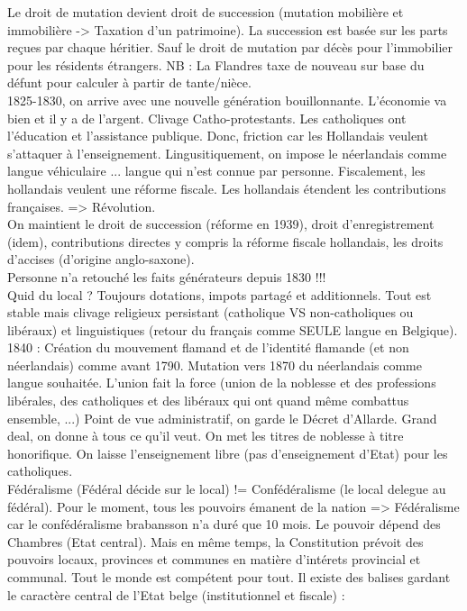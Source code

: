 \documentclass{book}
\begin{document}
Le droit de mutation devient droit de succession (mutation mobilière et immobilière -> Taxation d'un patrimoine). La succession est basée sur les parts reçues par chaque héritier. Sauf le droit de mutation par décès pour l'immobilier pour les résidents étrangers. NB : La Flandres taxe de nouveau sur base du défunt pour calculer à partir de tante/nièce.\\

1825-1830, on arrive avec une nouvelle génération bouillonnante. L'économie va bien et il y a de l'argent. Clivage Catho-protestants. Les catholiques ont l'éducation et l'assistance publique. Donc, friction car les Hollandais veulent s'attaquer à l'enseignement. Lingusitiquement, on impose le néerlandais comme langue véhiculaire ... langue qui n'est connue par personne. Fiscalement, les hollandais veulent une réforme fiscale. Les hollandais étendent les contributions françaises. => Révolution.\\

On maintient le droit de succession (réforme en 1939), droit d'enregistrement (idem), contributions directes y compris la réforme fiscale hollandais, les droits d'accises (d'origine anglo-saxone).\\

Personne n'a retouché les faits générateurs depuis 1830 !!!\\

Quid du local ? Toujours dotations, impots partagé et additionnels. Tout est stable mais clivage religieux persistant (catholique VS non-catholiques ou libéraux) et linguistiques (retour du français comme SEULE langue en Belgique). 1840 : Création du mouvement flamand et de l'identité flamande (et non néerlandais) comme avant 1790. Mutation vers 1870 du néerlandais comme langue souhaitée. L'union fait la force (union de la noblesse et des professions libérales, des catholiques et des libéraux qui ont quand même combattus ensemble, ...) Point de vue administratif, on garde le Décret d'Allarde. Grand deal, on donne à tous ce qu'il veut. On met les titres de noblesse à titre honorifique. On laisse l'enseignement libre (pas d'enseignement d'Etat) pour les catholiques.\\

Fédéralisme (Fédéral décide sur le local) != Confédéralisme (le local delegue au fédéral). Pour le moment, tous les pouvoirs émanent de la nation => Fédéralisme car le confédéralisme brabansson n'a duré que 10 mois. Le pouvoir dépend des Chambres (Etat central). Mais en même temps, la Constitution prévoit des pouvoirs locaux, provinces et communes en matière d'intérets provincial et communal. Tout le monde est compétent pour tout. Il existe des balises gardant le caractère central de l'Etat belge (institutionnel et fiscale) :\\
\end{document}
